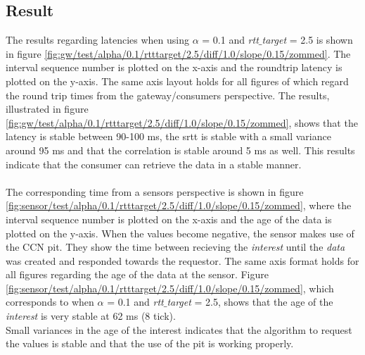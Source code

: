 \subsection{Result}
The results regarding latencies when using $\alpha$ = 0.1 and \textit{rtt$\_$target} = 2.5 is shown in figure \ref{fig:gw/test/alpha/0.1/rtttarget/2.5/diff/1.0/slope/0.15/zommed}. The interval sequence number is plotted on the x-axis and the roundtrip latency is plotted on the y-axis. The same axis layout holds for all figures of which regard the round trip times from the gateway/consumers perspective. 
The results, illustrated in figure \ref{fig:gw/test/alpha/0.1/rtttarget/2.5/diff/1.0/slope/0.15/zommed}, shows that the latency is stable between 90-100 ms, the srtt is stable with a small variance around 95 ms and that the correlation is stable around 5 ms as well. This results indicate that the consumer can retrieve the data in a stable manner.\\\\
The corresponding time from a sensors perspective is shown in figure \ref{fig:sensor/test/alpha/0.1/rtttarget/2.5/diff/1.0/slope/0.15/zommed}, where the interval sequence number is plotted on the x-axis and the age of the data is plotted on the y-axis. When the values become negative, the sensor makes use of the CCN pit. They show the time between recieving the \textit{interest} until the \textit{data} was created and responded towards the requestor. The same axis format holds for all figures regarding the age of the data at the sensor. Figure \ref{fig:sensor/test/alpha/0.1/rtttarget/2.5/diff/1.0/slope/0.15/zommed}, which corresponds to when $\alpha$ = 0.1 and \textit{rtt$\_$target} = 2.5, shows that the age of the \textit{interest} is very stable at 62 ms (8 tick). \\Small variances in the age of the interest indicates that the algorithm to request the values is stable and that the use of the pit is working properly.\\\\
